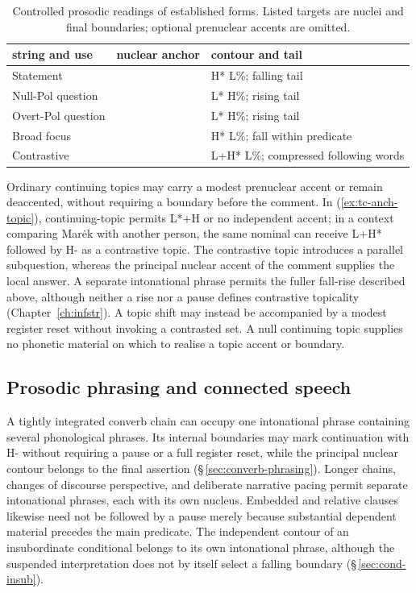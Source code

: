 \begin{table}[htbp]
\footnotesize
\caption{Controlled prosodic readings of established forms. Listed targets
are nuclei and final boundaries; optional prenuclear accents are omitted.}
\label{tab:prosodic-readings}
\begin{tabularx}{\textwidth}{L L L}
\toprule
{\sc string and use} & {\sc nuclear anchor} & {\sc contour and tail} \\
\midrule
{} Statement &  & H* L\%; falling tail \\
 Null-Pol question &  & L* H\%; rising tail \\
 Overt-Pol question &  & L* H\%; rising tail \\
 Broad focus &  & H* L\%; fall within predicate \\
 Contrastive  &  & L+H* L\%; compressed following words \\
\bottomrule
\end{tabularx}
\end{table}

Ordinary continuing topics may carry a modest prenuclear accent or remain
deaccented, without requiring a boundary before the comment. In
 
(\ref{ex:tc-anch-topic}), continuing-topic  permits L*+H or
no independent accent; in a context comparing Marėk with another person,
the same nominal can receive L+H* followed by H- as a contrastive topic.
The contrastive topic introduces a parallel subquestion, whereas the
principal nuclear accent of the comment supplies the local answer. A
separate intonational phrase permits the fuller fall-rise described above,
although neither a rise nor a pause defines contrastive topicality
(Chapter~\ref{ch:infstr}). A topic shift may instead be accompanied by a
modest register reset without invoking a contrasted set. A null continuing
topic supplies no phonetic material on which to realise a topic accent
or boundary.

\subsection{Prosodic phrasing and connected speech}\label{sec:boundary-phenomena}

A tightly integrated converb chain can occupy one intonational phrase
containing several phonological phrases. Its internal boundaries may mark
continuation with H- without requiring a pause or a full register reset,
while the principal nuclear contour belongs to the final assertion
(§\,\ref{sec:converb-phrasing}). Longer chains, changes of discourse
perspective, and deliberate narrative pacing permit separate intonational
phrases, each with its own nucleus. Embedded and relative clauses likewise
need not be followed by a pause merely because substantial dependent
material precedes the main predicate. The independent contour of an
insubordinate conditional belongs to its own intonational phrase, although
the suspended interpretation does not by itself select a falling boundary
(§\,\ref{sec:cond-insub}).

